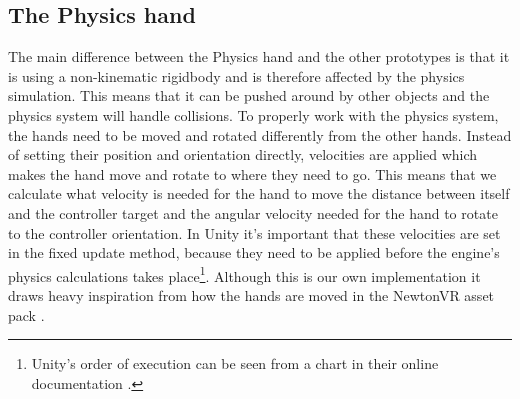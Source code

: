 \subsection{The Physics hand}
\label{subsec:physicsHand}
The main difference between the Physics hand and the other prototypes is that it is using a non-kinematic rigidbody and is therefore affected by the physics simulation. This means that it can be pushed around by other objects and the physics system will handle collisions. To properly work with the physics system, the hands need to be moved and rotated differently from the other hands. Instead of setting their position and orientation directly, velocities are applied which makes the hand move and rotate to where they need to go. This means that we calculate what velocity is needed for the hand to move the distance between itself and the controller target and the angular velocity needed for the hand to rotate to the controller orientation. In Unity it's important that these velocities are set in the fixed update method, because they need to be applied before the engine's physics calculations takes place\footnote{Unity's order of execution can be seen from a chart in their online documentation \parencite{UnityExecutionOrder2017}.}. Although this is our own implementation it draws heavy inspiration from how the hands are moved in the NewtonVR asset pack \parencite{TomorrowTodayLabs2016}.


